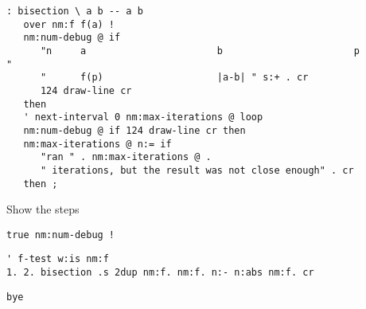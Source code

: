 \documentclass{article}
\begin{document}
\begin{verbatim}
: bisection \ a b -- a b
   over nm:f f(a) ! 
   nm:num-debug @ if
      "n     a                       b                       p                 "
      "      f(p)                    |a-b| " s:+ . cr
      124 draw-line cr
   then
   ' next-interval 0 nm:max-iterations @ loop
   nm:num-debug @ if 124 draw-line cr then
   nm:max-iterations @ n:= if
      "ran " . nm:max-iterations @ . 
      " iterations, but the result was not close enough" . cr 
   then ;
\end{verbatim}
Show the steps
\begin{verbatim}
true nm:num-debug !
\end{verbatim}
\begin{verbatim}
' f-test w:is nm:f
1. 2. bisection .s 2dup nm:f. nm:f. n:- n:abs nm:f. cr
\end{verbatim}
\begin{verbatim}
bye
\end{verbatim}
\end{document}
